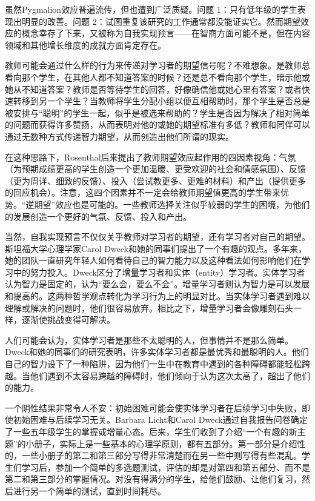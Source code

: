 虽然Pygmalion效应普遍流传，但也遭到广泛质疑。问题 1：只有低年级的学生表现出明显的改善。问题 2：试图重复该研究的工作通常都没能证实它。然而期望效应的概念幸存了下来，又被称为自我实现预言——在智商方面可能不是，但在内容领域和其他增长维度的成就方面肯定存在。

教师可能会通过什么样的行为来传递对学习者的期望信号呢？不难想象。是教师总看向那个学生，在其他人都不知道答案的时候？还是总不看向那个学生，暗示他或她从不知道答案？教师是否等待学生的回答，好像确信他或她心里有答案？或者快速转移到另一个学生？当教师将学生分配小组以便互相帮助时，那个学生是否总是被安排与“聪明”的学生一起，似乎是被选来帮助的？学生是否因为解决了相对简单的问题而获得许多赞扬，从而表明对他的或她的期望标准有多低？教师和同伴可以通过无数种方式传递智力期望，从而创造出他们所谓的现实。

在这种思路下，Rosenthal后来提出了教师期望效应起作用的四因素视角：气氛（为预期成绩更高的学生创造一个更加温暖、更受欢迎的社会和情感氛围）、反馈（更为周详、细致的反馈）、投入（尝试教更多、更难的材料）和产出（提供更多的回应机会）。注意，这四个因素并不一定会给教师期望值更高的学生带来优势。“逆期望”效应也是可能的。一些教师选择关注似乎较弱的学生的困境，为他们的发展创造一个更好的气氛、反馈、投入和产出。

当然，自我实现预言不仅仅关乎教师对学习者的期望，还有学习者对自己的期望。斯坦福大学心理学家Carol Dweck和她的同事们提出了一个有趣的观点。多年来，她的团队一直研究年轻人如何看待自己的智力能力以及这种看法如何影响他们在学习中的努力投入。Dweck区分了增量学习者和实体（entity）学习者。实体学习者认为智力是固定的，认为“要么会，要么不会”。增量学习者则认为智力是可以发展和提高的。这两种哲学观点转化为学习行为上的明显对比。当实体学习者遇到难以理解或解决的问题时，他们很容易放弃。相比之下，增量学习者会像雕刻石头一样，逐渐使挑战变得可解决。

人们可能会认为，实体学习者是那些不太聪明的人，但事情并不是那么简单。Dweck和她的同事们的研究表明，许多实体学习者都是最优秀和最聪明的人。他们自己的智力设下了一种陷阱，因为他们一生中在教育中遇到的各种障碍都能轻松跨越。当他们遇到不太容易跨越的障碍时，他们倾向于认为这次太高了，超出了他们的能力。

一个阴性结果非常令人不安：初始困难可能会使实体学习者在后续学习中失败，即使初始困难与后续学习无关。Barbara Licht和Carol Dweck通过自我报告问卷确定了一些五年级学生的掌握或增量心态。后来，学生们收到了介绍“一个有趣的新主题”的小册子，实际上是一些基本的心理学原则，都有五部分。第一部分是介绍性的，一些小册子的第二和第三部分写得非常清楚而在另一些中则写得有些混乱。学生们学习后，参加一个简单的多选题测试，评估的却是对第四和第五部分、而不是第二和第三部分的掌握情况。对没有得满分的学生，给他们鼓励、让他们复习，然后进行另一个简单的测试，直到时间耗尽。

